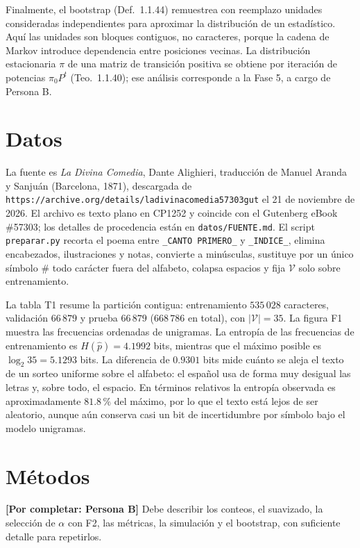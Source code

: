 \documentclass[11pt,letterpaper]{article}
\begin{document}
Finalmente, el bootstrap (Def.\ 1.1.44) remuestrea con reemplazo unidades
consideradas independientes para aproximar la distribución de un estadístico.
Aquí las unidades son bloques contiguos, no caracteres, porque la cadena de
Markov introduce dependencia entre posiciones vecinas. La distribución
estacionaria $\pi$ de una matriz de transición positiva se obtiene por
iteración de potencias $\pi_0P^t$ (Teo.\ 1.1.40); ese análisis corresponde a la
Fase 5, a cargo de Persona B.

\section{Datos}

La fuente es \emph{La Divina Comedia}, Dante Alighieri, traducción de Manuel
Aranda y Sanjuán (Barcelona, 1871), descargada de
\texttt{https://archive.org/details/ladivinacomedia57303gut} el 21 de
noviembre de 2026. El archivo es texto plano en CP1252 y coincide con el
Gutenberg eBook \#57303; los detalles de procedencia están en
\texttt{datos/FUENTE.md}. El script \texttt{preparar.py} recorta el poema entre
\texttt{\_CANTO PRIMERO\_} y \texttt{\_INDICE\_}, elimina encabezados,
ilustraciones y notas, convierte a minúsculas, sustituye por un único símbolo
\# todo carácter fuera del alfabeto, colapsa espacios y fija $\mathcal{V}$ solo
sobre entrenamiento.

La tabla T1 resume la partición contigua: entrenamiento $535\,028$ caracteres,
validación $66\,879$ y prueba $66\,879$ ($668\,786$ en total), con
$\vert\mathcal{V}\vert=35$. La figura F1 muestra las frecuencias ordenadas de
unigramas. La entropía de las frecuencias de entrenamiento es
$H(\hat p)=4.1992$ bits, mientras que el máximo posible es
$\log_2 35=5.1293$ bits. La diferencia de $0.9301$ bits mide cuánto se aleja el
texto de un sorteo uniforme sobre el alfabeto: el español usa de forma muy
desigual las letras y, sobre todo, el espacio. En términos relativos la
entropía observada es aproximadamente $81.8\,\%$ del máximo, por lo que el texto está lejos
de ser aleatorio, aunque aún conserva casi un bit de incertidumbre por símbolo
bajo el modelo unigramas.

\section{Métodos}

\textbf{[Por completar: Persona B]} Debe describir los conteos, el suavizado,
la selección de $\alpha$ con F2, las métricas, la simulación y el bootstrap,
con suficiente detalle para repetirlos.
\end{document}
